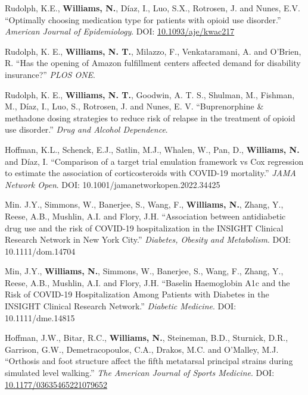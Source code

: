 \documentclass[12pt,letterpaper]{report}
\begin{document}
\begin{tablist}
        \item[2023] \tab Rudolph, K.E., \textbf{Williams, N.}, Díaz, I., Luo, S.X., Rotrosen, J. and Nunes, E.V. \enquote{Optimally choosing medication type for patients with opioid use disorder.} \textit{American Journal of Epidemiology}. DOI: \href{https://doi.org/10.1093/aje/kwac217}{10.1093/aje/kwac217}
        
        \item[2023] \tab Rudolph, K. E., \textbf{Williams, N. T.}, Milazzo, F., Venkataramani, A. and O’Brien, R. \enquote{Has the opening of Amazon fulfillment centers affected demand for disability insurance?} \textit{PLOS ONE}.
        
        \item[2022] \tab Rudolph, K. E., \textbf{Williams, N. T.}, Goodwin, A. T. S., Shulman, M., Fishman, M., Díaz, I., Luo, S., Rotrosen, J. and Nunes, E. V. \enquote{Buprenorphine \& methadone dosing strategies to reduce risk of relapse in the treatment of opioid use disorder.} \textit{Drug and Alcohol Dependence}.
        
            	\item[2022]\tab Hoffman, K.L., Schenck, E.J., Satlin, M.J., Whalen, W., Pan, D., \textbf{Williams, N.} and Díaz, I. \enquote{Comparison of a target trial emulation framework vs Cox regression to estimate the association of corticosteroids with COVID-19 mortality.} \textit{JAMA Network Open}. DOI: 10.1001/jamanetworkopen.2022.34425

    \item[2022] \tab Min. J.Y., Simmons, W., Banerjee, S., Wang, F., \textbf{Williams, N.}, Zhang, Y., Reese, A.B., Mushlin, A.I. and Flory, J.H. \enquote{Association between antidiabetic drug use and the risk of COVID-19 hospitalization in the INSIGHT Clinical Research Network in New York City.} \textit{Diabetes, Obesity and Metabolism}. DOI: 10.1111/dom.14704
    
    \item[2022] \tab Min, J.Y., \textbf{Williams, N.}, Simmons, W., Banerjee, S., Wang, F., Zhang, Y., Reese, A.B., Mushlin, A.I. and Flory, J.H. \enquote{Baselin Haemoglobin A1c and the Risk of COVID-19 Hospitalization Among Patients with Diabetes in the INSIGHT Clinical Research Network.} \textit{Diabetic Medicine}. DOI: 10.1111/dme.14815 
    
    \item[2022] \tab Hoffman, J.W., Bitar, R.C., \textbf{Williams, N.}, Steineman, B.D., Sturnick, D.R., Garrison, G.W., Demetracopoulos, C.A., Drakos, M.C. and O'Malley, M.J. \enquote{Orthosis and foot structure affect the fifth metatarsal principal strains during simulated level walking.} \textit{The American Journal of Sports Medicine}. DOI: \href{https://doi.org/10.1177/03635465221079652}{10.1177/03635465221079652}
    

\end{tablist}
\end{document}
